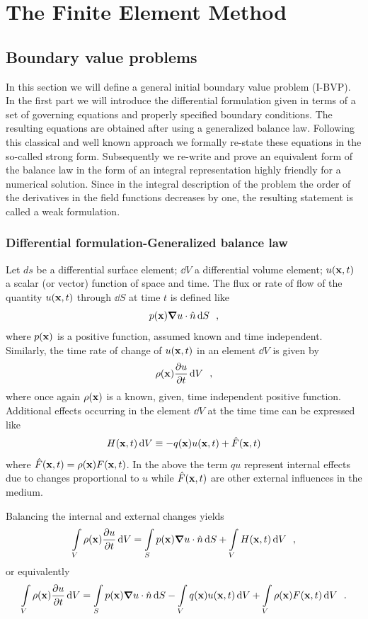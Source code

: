 \graphicspath{ {./img/TheFEM/} }
\chapter{The Finite Element Method}
\section{Boundary value problems}
In this section we will define a general initial boundary value problem (I-BVP). In the first part we will introduce the differential formulation given in terms of a set of governing equations and properly specified boundary conditions. The resulting equations are obtained after using a generalized balance law. Following this classical and well known approach we formally re-state these equations in the so-called strong form. Subsequently we re-write and prove an equivalent form of the balance law in the form of an integral representation highly friendly for a numerical solution. Since in the integral description of the problem the order of the derivatives in the field functions decreases by one, the resulting statement is called a weak formulation. 
\subsection{Differential formulation-Generalized balance law}
Let $ds$ be a differential surface element; $\dd{V}$ a differential volume element; $u(\vb{x},t)$ a scalar (or vector) function of space and time.
The flux or rate of flow of the quantity $u(\vb x, t)$ through $\dd{S}$ at time $t$ is defined like
\[p(\vb x)\grad u \cdot \hat n \dd{S} \enspace ,\]
where $p(\vb x)$ is a positive function, assumed known and time independent. Similarly, the time rate of change of $u(\vb x, t)$ in an element $\dd{V}$ is given by
\[\rho (\vb x)\pdv{u}{t} \dd{V} \enspace ,\]
where once again $\rho (\vb x)$ is a known, given, time independent positive function. Additional effects occurring in the element $\dd{V}$ at the time time can be expressed like
\[H(\vb x, t)\dd{V} \equiv  - q(\vb x)u(\vb x, t) + \hat F(\vb x,t)\]
where $\hat F(\vb x, t) = \rho (\vb x)F(\vb x, t)$. In the above the term $q u$ represent internal effects due to changes proportional to $u$ while $\hat F(\vb x, t)$ are other external influences in the medium.

Balancing the internal and external changes yields
\[\int\limits_V \rho (\vb x)\pdv{u}{t}\dd{V} = \int\limits_S p(\vb x)\vb \grad u \cdot \hat n\dd{S}  + \int\limits_V H(\vb x, t)\dd{V} \enspace ,\]
or equivalently
\[\int\limits_V \rho (\vb x)\pdv{u}{t}\dd{V} = \int\limits_S p(\vb x)\vb \grad u \cdot \hat n\dd{S}   - \int\limits_V q(\vb x)u(\vb x, t)\dd{V}  + \int\limits_V \rho (\vb x)F(\vb x, t)\dd{V} \enspace .\]


